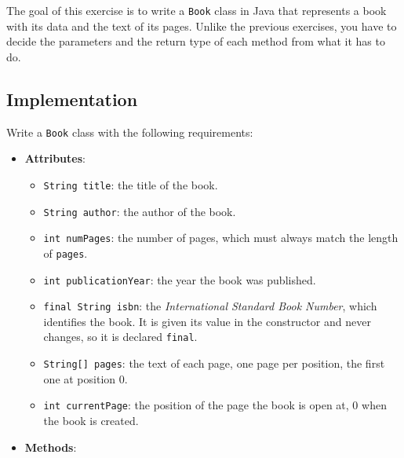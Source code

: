 The goal of this exercise is to write a \texttt{Book} class in Java that represents a book with its data and the text of its pages. Unlike the previous exercises, you have to decide the parameters and the return type of each method from what it has to do.

\subsection{Implementation}

Write a \texttt{Book} class with the following requirements:

\begin{itemize}

    \item \textbf{Attributes}:

        \begin{itemize}

            \item \texttt{String title}: the title of the book.

            \item \texttt{String author}: the author of the book.

            \item \texttt{int numPages}: the number of pages, which must always match the length of \texttt{pages}.

            \item \texttt{int publicationYear}: the year the book was published.

            \item \texttt{final String isbn}: the \textit{International Standard Book Number}, which identifies the book. It is given its value in the constructor and never changes, so it is declared \texttt{final}.

            \item \texttt{String[] pages}: the text of each page, one page per position, the first one at position 0.

            \item \texttt{int currentPage}: the position of the page the book is open at, 0 when the book is created.

        \end{itemize}

    \item \textbf{Methods}:

        \begin{itemize}


\end{itemize}
\end{itemize}
